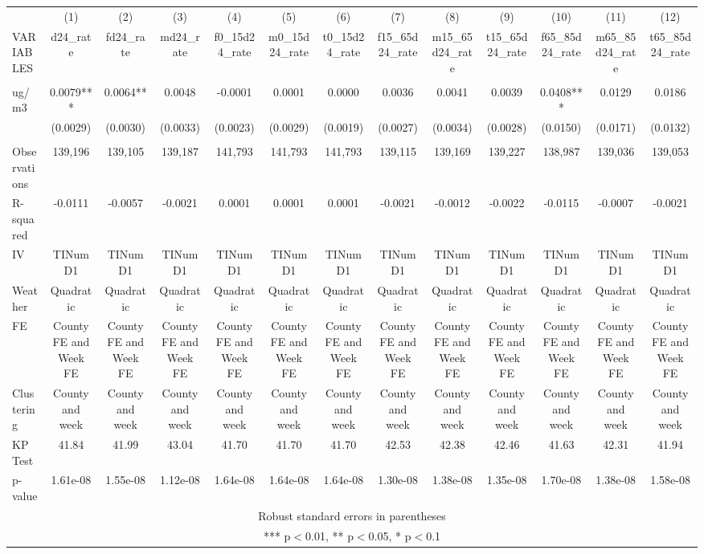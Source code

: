 \begin{tabular}{lcccccccccccc} \hline
 & (1) & (2) & (3) & (4) & (5) & (6) & (7) & (8) & (9) & (10) & (11) & (12) \\
VARIABLES & d24\_rate & fd24\_rate & md24\_rate & f0\_15d24\_rate & m0\_15d24\_rate & t0\_15d24\_rate & f15\_65d24\_rate & m15\_65d24\_rate & t15\_65d24\_rate & f65\_85d24\_rate & m65\_85d24\_rate & t65\_85d24\_rate \\ \hline
 &  &  &  &  &  &  &  &  &  &  &  &  \\
ug/m3 & 0.0079*** & 0.0064** & 0.0048 & -0.0001 & 0.0001 & 0.0000 & 0.0036 & 0.0041 & 0.0039 & 0.0408*** & 0.0129 & 0.0186 \\
 & (0.0029) & (0.0030) & (0.0033) & (0.0023) & (0.0029) & (0.0019) & (0.0027) & (0.0034) & (0.0028) & (0.0150) & (0.0171) & (0.0132) \\
 &  &  &  &  &  &  &  &  &  &  &  &  \\
Observations & 139,196 & 139,105 & 139,187 & 141,793 & 141,793 & 141,793 & 139,115 & 139,169 & 139,227 & 138,987 & 139,036 & 139,053 \\
R-squared & -0.0111 & -0.0057 & -0.0021 & 0.0001 & 0.0001 & 0.0001 & -0.0021 & -0.0012 & -0.0022 & -0.0115 & -0.0007 & -0.0021 \\
IV & TINumD1 & TINumD1 & TINumD1 & TINumD1 & TINumD1 & TINumD1 & TINumD1 & TINumD1 & TINumD1 & TINumD1 & TINumD1 & TINumD1 \\
Weather & Quadratic & Quadratic & Quadratic & Quadratic & Quadratic & Quadratic & Quadratic & Quadratic & Quadratic & Quadratic & Quadratic & Quadratic \\
FE & County FE and Week FE & County FE and Week FE & County FE and Week FE & County FE and Week FE & County FE and Week FE & County FE and Week FE & County FE and Week FE & County FE and Week FE & County FE and Week FE & County FE and Week FE & County FE and Week FE & County FE and Week FE \\
Clustering & County and week & County and week & County and week & County and week & County and week & County and week & County and week & County and week & County and week & County and week & County and week & County and week \\
KP Test & 41.84 & 41.99 & 43.04 & 41.70 & 41.70 & 41.70 & 42.53 & 42.38 & 42.46 & 41.63 & 42.31 & 41.94 \\
 p-value & 1.61e-08 & 1.55e-08 & 1.12e-08 & 1.64e-08 & 1.64e-08 & 1.64e-08 & 1.30e-08 & 1.38e-08 & 1.35e-08 & 1.70e-08 & 1.38e-08 & 1.58e-08 \\ \hline
\multicolumn{13}{c}{ Robust standard errors in parentheses} \\
\multicolumn{13}{c}{ *** p$<$0.01, ** p$<$0.05, * p$<$0.1} \\
\end{tabular}
